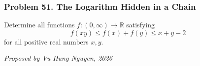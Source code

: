 \subsubsection*{Problem 51. The Logarithm Hidden in a Chain}

\begin{exercisebox}[medium]

Determine all functions $f:(0,\infty)\to\mathbb R$ satisfying
\[
\boxed{\qquad
f(xy)\le f(x)+f(y)\le x+y-2
\qquad}
\]
for all positive real numbers $x,y$.

\begin{flushright}
\textit{Proposed by Vu Hung Nguyen, 2026}
\end{flushright}


\end{exercisebox}
